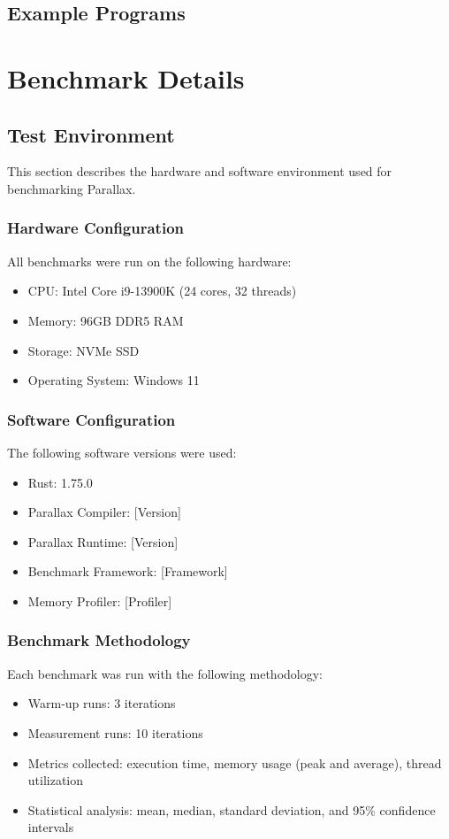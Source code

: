 \documentclass[12pt,a4paper]{report}
\begin{document}
\section{Example Programs}

\chapter{Benchmark Details}
\section{Test Environment}
This section describes the hardware and software environment used for benchmarking Parallax.

\subsection{Hardware Configuration}
All benchmarks were run on the following hardware:
\begin{itemize}
    \item CPU: Intel Core i9-13900K (24 cores, 32 threads)
    \item Memory: 96GB DDR5 RAM
    \item Storage: NVMe SSD
    \item Operating System: Windows 11
\end{itemize}

\subsection{Software Configuration}
The following software versions were used:
\begin{itemize}
    \item Rust: 1.75.0
    \item Parallax Compiler: [Version]
    \item Parallax Runtime: [Version]
    \item Benchmark Framework: [Framework]
    \item Memory Profiler: [Profiler]
\end{itemize}

\subsection{Benchmark Methodology}
Each benchmark was run with the following methodology:
\begin{itemize}
    \item Warm-up runs: 3 iterations
    \item Measurement runs: 10 iterations
    \item Metrics collected: execution time, memory usage (peak and average), thread utilization
    \item Statistical analysis: mean, median, standard deviation, and 95\% confidence intervals
\end{itemize}
\end{document}
